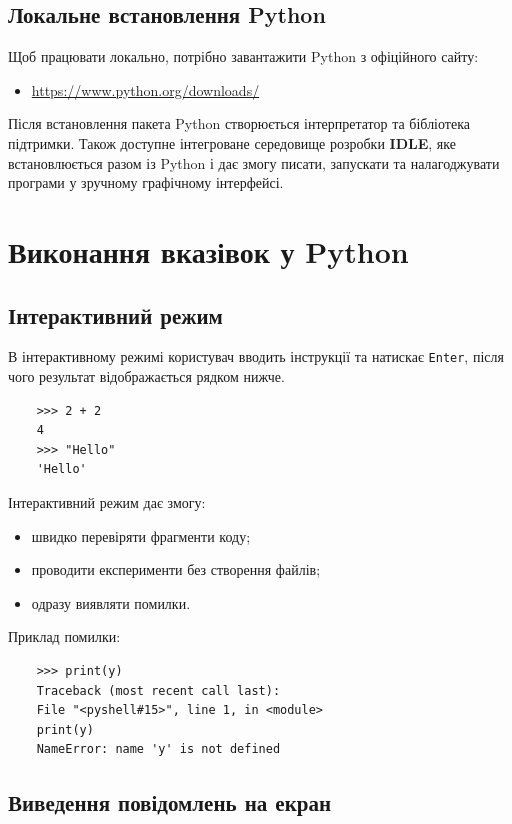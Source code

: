 \subsection*{Локальне встановлення Python}

Щоб працювати локально, потрібно завантажити Python з офіційного сайту:
\begin{itemize}
	\item \url{https://www.python.org/downloads/}
\end{itemize}

Після встановлення пакета Python створюється інтерпретатор та бібліотека підтримки. Також доступне інтегроване середовище розробки \textbf{IDLE}, яке встановлюється разом із Python і дає змогу писати, запускати та налагоджувати програми у зручному графічному інтерфейсі.

\section{Виконання вказівок у Python}

\subsection*{Інтерактивний режим}

В інтерактивному режимі користувач вводить інструкції та натискає \texttt{Enter}, після чого результат відображається рядком нижче.

\begin{verbatim}
	>>> 2 + 2
	4
	>>> "Hello"
	'Hello'
\end{verbatim}

Інтерактивний режим дає змогу:
\begin{itemize}
	\item швидко перевіряти фрагменти коду;
	\item проводити експерименти без створення файлів;
	\item одразу виявляти помилки.
\end{itemize}

Приклад помилки:
\begin{verbatim}
	>>> print(y)
	Traceback (most recent call last):
	File "<pyshell#15>", line 1, in <module>
	print(y)
	NameError: name 'y' is not defined
\end{verbatim}

\subsection*{Виведення повідомлень на екран}

